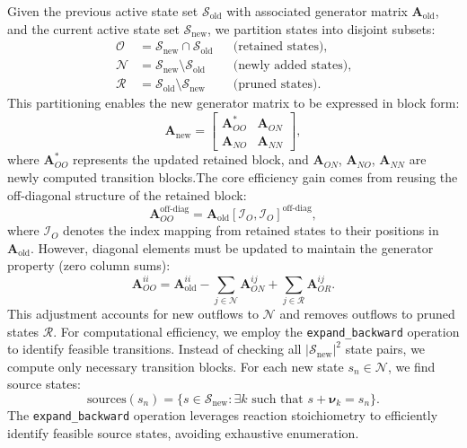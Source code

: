 \documentclass[final,supplement,onefignum,onetabnum]{siamart171218}
\begin{document}
Given the previous active state set $\mathcal{S}_{\text{old}}$ with associated generator matrix $\mathbf{A}_{\text{old}}$, and the current active state set $\mathcal{S}_{\text{new}}$, we partition states into disjoint subsets:
\begin{align}
\mathcal{O} &= \mathcal{S}_{\text{new}} \cap \mathcal{S}_{\text{old}} && \text{(retained states)}, \\
\mathcal{N} &= \mathcal{S}_{\text{new}} \setminus \mathcal{S}_{\text{old}} && \text{(newly added states)}, \\
\mathcal{R} &= \mathcal{S}_{\text{old}} \setminus \mathcal{S}_{\text{new}} && \text{(pruned states)}.
\end{align}
This partitioning enables the new generator matrix to be expressed in block form:
\begin{equation}
\mathbf{A}_{\text{new}} = \begin{bmatrix}
\mathbf{A}_{OO}^* & \mathbf{A}_{ON} \\
\mathbf{A}_{NO} & \mathbf{A}_{NN}
\end{bmatrix},
\end{equation}
where $\mathbf{A}_{OO}^*$ represents the updated retained block, and $\mathbf{A}_{ON}$, $\mathbf{A}_{NO}$, $\mathbf{A}_{NN}$ are newly computed transition blocks.The core efficiency gain comes from reusing the off-diagonal structure of the retained block:
\begin{equation}
\mathbf{A}_{OO}^{\text{off-diag}} = \mathbf{A}_{\text{old}}[\mathcal{I}_O, \mathcal{I}_O]^{\text{off-diag}},
\end{equation}
where $\mathcal{I}_O$ denotes the index mapping from retained states to their positions in $\mathbf{A}_{\text{old}}$. However, diagonal elements must be updated to maintain the generator property (zero column sums):
\begin{equation}
\mathbf{A}_{OO}^{ii} = \mathbf{A}_{\text{old}}^{ii} - \sum_{j \in \mathcal{N}} \mathbf{A}_{ON}^{ij} + \sum_{j \in \mathcal{R}} \mathbf{A}_{OR}^{ij}.
\end{equation}
This adjustment accounts for new outflows to $\mathcal{N}$ and removes outflows to pruned states $\mathcal{R}$. For computational efficiency, we employ the \texttt{expand\_backward} operation to identify feasible transitions. Instead of checking all $|\mathcal{S}_{\text{new}}|^2$ state pairs, we compute only necessary transition blocks. For each new state $s_n \in \mathcal{N}$, we find source states:
\begin{equation}
\text{sources}(s_n) = \{s \in \mathcal{S}_{\text{new}} : \exists k \text{ such that } s + \boldsymbol{\nu}_k = s_n\}.
\end{equation}
The \texttt{expand\_backward} operation leverages reaction stoichiometry to efficiently identify feasible source states, avoiding exhaustive enumeration.
\end{document}
